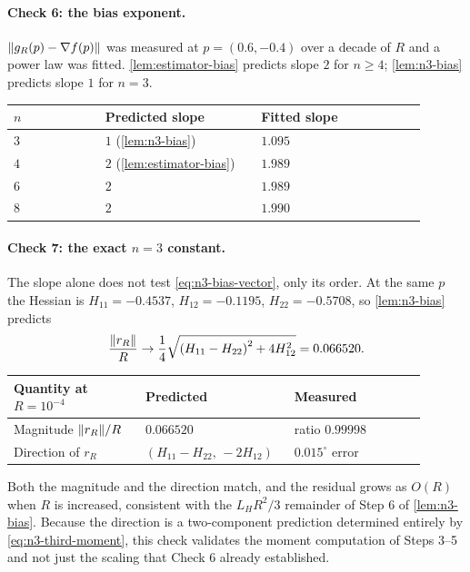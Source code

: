 \documentclass[11pt,a4paper]{article}
\theoremstyle{plain}
\theoremstyle{definition}
\DeclarePairedDelimiter{\norm}{\lVert}{\rVert}
\begin{document}
\paragraph{Check 6: the bias exponent.}
$\norm{g_R(p)-\nabla f(p)}$ was measured at $p=(0.6,-0.4)$ over a decade of $R$ and a power law
was fitted. \cref{lem:estimator-bias} predicts slope $2$ for $n\geq4$;
\cref{lem:n3-bias} predicts slope $1$ for $n=3$.

\begin{center}
\begin{longtable}{@{}p{0.20\linewidth}p{0.34\linewidth}p{0.36\linewidth}@{}}
\toprule
$n$ & Predicted slope & Fitted slope \\
\midrule
\endhead
$3$ & $1$ (\cref{lem:n3-bias}) & $1.095$ \\
$4$ & $2$ (\cref{lem:estimator-bias}) & $1.989$ \\
$6$ & $2$ & $1.989$ \\
$8$ & $2$ & $1.990$ \\
\bottomrule
\end{longtable}
\end{center}

\paragraph{Check 7: the exact $n=3$ constant.}
The slope alone does not test \eqref{eq:n3-bias-vector}, only its order. At the same $p$ the
Hessian is $H_{11}=-0.4537$, $H_{12}=-0.1195$, $H_{22}=-0.5708$, so
\cref{lem:n3-bias} predicts
\begin{equation*}
    \frac{\norm{r_R}}{R}\to\frac14\sqrt{\left(H_{11}-H_{22}\right)^2+4H_{12}^2}
    =0.066520 .
\end{equation*}

\begin{center}
\begin{longtable}{@{}p{0.30\linewidth}p{0.30\linewidth}p{0.30\linewidth}@{}}
\toprule
Quantity at $R=10^{-4}$ & Predicted & Measured \\
\midrule
\endhead
Magnitude $\norm{r_R}/R$ & $0.066520$ & ratio $0.99998$ \\
Direction of $r_R$ & $\left(H_{11}-H_{22},\,-2H_{12}\right)$ & $0.015^\circ$ error \\
\bottomrule
\end{longtable}
\end{center}

Both the magnitude and the direction match, and the residual grows as $O(R)$ when $R$ is
increased, consistent with the $L_HR^2/3$ remainder of Step 6 of \cref{lem:n3-bias}. Because the
direction is a two-component prediction determined entirely by
\eqref{eq:n3-third-moment}, this check validates the moment computation of Steps 3--5 and not just
the scaling that Check 6 already established.
\end{document}
